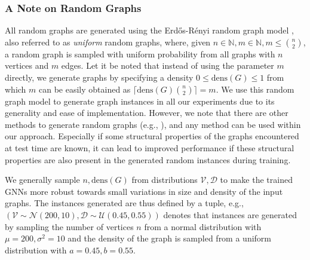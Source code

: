 \documentclass[draft,final]{vutinfth} %
\begin{document}
\subsubsection{A Note on Random Graphs}
All random graphs are generated using the Erd\H{o}s-Rényi random graph model \cite{erdos59a}, also referred to as \emph{uniform} random graphs, where, given $n \in \mathbb{N}, m \in \mathbb{N}, m \leq \binom{n}{2}$, a random graph is sampled with uniform probability from all graphs with $n$ vertices and $m$ edges. Let it be noted that instead of using the parameter $m$ directly, we generate graphs by specifying a density $0 \leq \mathrm{dens}(G) \leq 1$ from which $m$ can be easily obtained as $\lceil \mathrm{dens}(G) \binom{n}{2} \rceil = m$. 
We use this random graph model to generate graph instances in all our experiments due to its generality and ease of implementation. 
However, we note that there are other methods to generate random graphs (e.g., \cite{Aiello2001}), and any method can be used within our approach. Especially if some structural properties of the graphs encountered at test time are known, it can lead to improved performance if these structural properties are also present in the generated random instances during training. 

We generally sample $n, \mathrm{dens}(G)$ from distributions $\mathcal{V}, \mathcal{D}$ to make the trained GNNs more robust towards small variations in size and density of the input graphs. The instances generated are thus defined by a tuple, e.g., $(\mathcal{V} \sim \mathcal{N}(200, 10), \mathcal{D} \sim \mathcal{U}(0.45, 0.55))$ denotes that instances are generated by sampling the number of vertices $n$ from a normal distribution with $\mu=200, \sigma^2 = 10$ and the density of the graph is sampled from a uniform distribution with $a=0.45, b=0.55$. 
\end{document}
